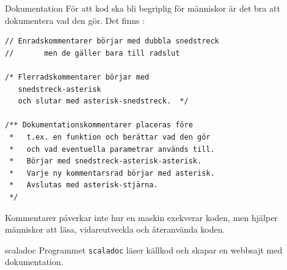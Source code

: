 \begin{Slide}{Dokumentation}\footnotesize
För att kod ska bli begriplig för människor är det bra att dokumentera vad den gör. Det finns :
\begin{lstlisting}
// Enradskommentarer börjar med dubbla snedstreck
//       men de gäller bara till radslut

/* Flerradskommentarer börjar med
   snedstreck-asterisk
   och slutar med asterisk-snedstreck.  */

/** Dokumentationskommentarer placeras före
 *   t.ex. en funktion och berättar vad den gör
 *   och vad eventuella parametrar används till.
 *   Börjar med snedstreck-asterisk-asterisk.
 *   Varje ny kommentarsrad börjar med asterisk.
 *   Avslutas med asterisk-stjärna.
 */
\end{lstlisting}
Kommentarer påverkar inte hur en maskin exekverar koden, men hjälper människor att läsa, vidareutveckla och återanvända koden.
\end{Slide}

\begin{Slide}{scaladoc}
Programmet \texttt{scaladoc} läser källkod och skapar en webbsajt med dokumentation.

\vspace{2em}
\end{Slide}


\ifkompendium\else

